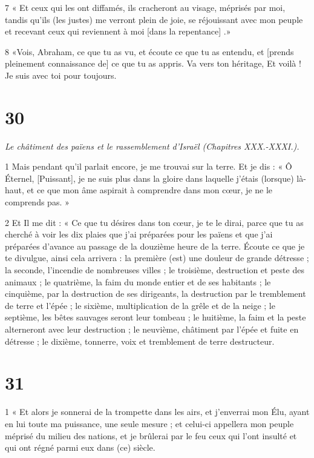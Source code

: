 \par 7 « Et ceux qui les ont diffamés, ils cracheront au visage, méprisés par moi, tandis qu'ils (les justes) me verront plein de joie, se réjouissant avec mon peuple et recevant ceux qui reviennent à moi [dans la repentance] .»

\par 8 «Vois, Abraham, ce que tu as vu, et écoute ce que tu as entendu, et [prends pleinement connaissance de] ce que tu as appris. Va vers ton héritage, Et voilà ! Je suis avec toi pour toujours.

\chapter{30}

\par \textit{Le châtiment des païens et le rassemblement d'Israël (Chapitres XXX.-XXXI.).}

\par 1 Mais pendant qu'il parlait encore, je me trouvai sur la terre. Et je dis : « Ô Éternel, [Puissant], je ne suis plus dans la gloire dans laquelle j’étais (lorsque) là-haut, et ce que mon âme aspirait à comprendre dans mon cœur, je ne le comprends pas. »

\par 2 Et Il me dit : « Ce que tu désires dans ton cœur, je te le dirai, parce que tu as cherché à voir les dix plaies que j'ai préparées pour les païens et que j'ai préparées d'avance au passage de la douzième heure de la terre. Écoute ce que je te divulgue, ainsi cela arrivera : la première (est) une douleur de grande détresse ; la seconde, l'incendie de nombreuses villes ; le troisième, destruction et peste des animaux ; le quatrième, la faim du monde entier et de ses habitants ; le cinquième, par la destruction de ses dirigeants, la destruction par le tremblement de terre et l'épée ; le sixième, multiplication de la grêle et de la neige ; le septième, les bêtes sauvages seront leur tombeau ; le huitième, la faim et la peste alterneront avec leur destruction ; le neuvième, châtiment par l'épée et fuite en détresse ; le dixième, tonnerre, voix et tremblement de terre destructeur.

\chapter{31}

\par 1 « Et alors je sonnerai de la trompette dans les airs, et j'enverrai mon Élu, ayant en lui toute ma puissance, une seule mesure ; et celui-ci appellera mon peuple méprisé du milieu des nations, et je brûlerai par le feu ceux qui l'ont insulté et qui ont régné parmi eux dans (ce) siècle.

